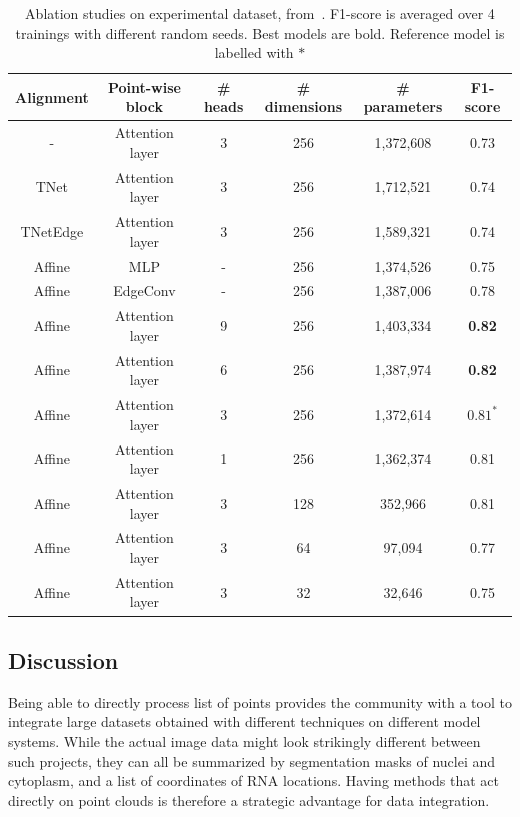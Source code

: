\begin{table}[]
	\centering
	\begin{tabular}{| c | c | c | c | c | c |}
		\hline
		Alignment & Point-wise block & \# heads & \# dimensions & \# parameters & F1-score \\
		\hline\hline
		- & Attention layer & 3 & 256 & 1,372,608 & 0.73\\
		TNet & Attention layer & 3 & 256 & 1,712,521 & 0.74\\
		TNetEdge & Attention layer & 3 & 256 & 1,589,321 & 0.74\\
		\hline\hline
		Affine & MLP & - & 256 & 1,374,526 & 0.75\\
		Affine & EdgeConv & - & 256 & 1,387,006 & 0.78\\
		\hline\hline
		Affine & Attention layer & 9 & 256 & 1,403,334 & \textbf{0.82}\\
		Affine & Attention layer & 6 & 256 & 1,387,974 & \textbf{0.82}\\
		Affine & Attention layer & 3 & 256 & 1,372,614 & $0.81^{\ast}$\\
		Affine & Attention layer & 1 & 256 & 1,362,374 & 0.81\\
		\hline\hline
		Affine & Attention layer & 3 & 128 & 352,966 & 0.81\\
		Affine & Attention layer & 3 & 64 & 97,094 & 0.77\\
		Affine & Attention layer & 3 & 32 & 32,646 & 0.75\\
		\hline
	\end{tabular}
	\caption[Ablation studies (PointFISH)]{Ablation studies on experimental dataset, from~\cite{pointfish_2022}.
	F1-score is averaged over 4 trainings with different random seeds.
	Best models are bold.
	Reference model is labelled with $\ast$}
	\label{table:ablation}
\end{table}

\subsection{Discussion}
\label{subsec:discussion}

Being able to directly process list of points provides the community with a tool to integrate large datasets obtained with different techniques on different model systems.
While the actual image data might look strikingly different between such projects, they can all be summarized by segmentation masks of nuclei and cytoplasm, and a list of coordinates of \ac{RNA} locations.
Having methods that act directly on point clouds is therefore a strategic advantage for data integration.

